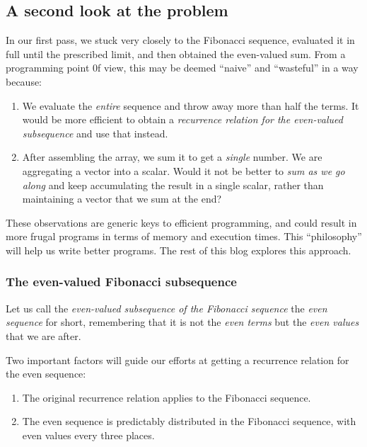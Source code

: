 \documentclass[
  a4paper,
]{article}
\begin{document}
\hypertarget{a-second-look-at-the-problem}{%
\subsection{A second look at the
problem}\label{a-second-look-at-the-problem}}

In our first pass, we stuck very closely to the Fibonacci sequence,
evaluated it in full until the prescribed limit, and then obtained the
even-valued sum. From a programming point 0f view, this may be deemed
``naive'' and ``wasteful'' in a way because:

\begin{enumerate}
\item
  We evaluate the \emph{entire} sequence and throw away more than half
  the terms. It would be more efficient to obtain a \emph{recurrence
  relation for the even-valued subsequence} and use that instead.
\item
  After assembling the array, we sum it to get a \emph{single} number.
  We are aggregating a vector into a scalar. Would it not be better to
  \emph{sum as we go along} and keep accumulating the result in a single
  scalar, rather than maintaining a vector that we sum at the end?
\end{enumerate}

These observations are generic keys to efficient programming, and could
result in more frugal programs in terms of memory and execution times.
This ``philosophy'' will help us write better programs. The rest of this
blog explores this approach.

\hypertarget{the-even-valued-fibonacci-subsequence-1}{%
\subsubsection{The even-valued Fibonacci
subsequence}\label{the-even-valued-fibonacci-subsequence-1}}

Let us call the \emph{even-valued subsequence of the Fibonacci sequence}
the \emph{even sequence} for short, remembering that it is not the
\emph{even terms} but the \emph{even values} that we are after.

Two important factors will guide our efforts at getting a recurrence
relation for the even sequence:

\begin{enumerate}
\item
  The original recurrence relation applies to the Fibonacci sequence.
\item
  The even sequence is predictably distributed in the Fibonacci
  sequence, with even values every three places.
\end{enumerate}
\end{document}
